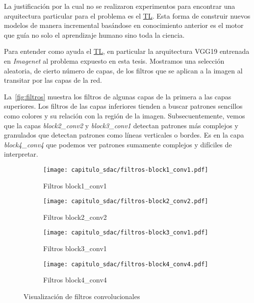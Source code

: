 La justificación por la cual no se realizaron experimentos para encontrar una
arquitectura particular para el problema es el \hyperlink{abbr}{TL}. Esta forma de
construir nuevos modelos de manera incremental basándose en conocimiento
anterior es el motor que guía no solo el aprendizaje humano sino toda la
ciencia.

Para entender como ayuda el \hyperlink{abbr}{TL}, en particular la arquitectura
VGG19 entrenada en \emph{Imagenet} al problema expuesto en esta tesis. Mostramos
una selección aleatoria, de cierto número de capas, de los filtros que se
aplican a la imagen al transitar por las capas de la red. 

La~\autoref{fig:filtros} muestra los filtros de algunas capas de la primera a
las capas superiores. Los filtros de las capas inferiores tienden a buscar
patrones sencillos como colores y su relación con la región de la imagen.
Subsecuentemente, vemos que la capas \emph{block2\_conv2} y \emph{block3\_conv1}
detectan patrones más complejos y granulados que detectan patrones como líneas
verticales o bordes. Es en la capa \emph{block4\_conv4} que podemos ver patrones
sumamente complejos y difíciles de interpretar.

\begin{figure}[H] 
  \begin{subfigure}[b]{0.5\linewidth}
    \centering
    \texttt{[image: capitulo\_sdac/filtros-block1\_conv1.pdf]} 
    \caption{Filtros block1\_conv1}\label{fig7:aa}
    \vspace{4ex}
  \end{subfigure}%
  \begin{subfigure}[b]{0.5\linewidth}
    \centering
    \texttt{[image: capitulo\_sdac/filtros-block2\_conv2.pdf]} 
    \caption{Filtros block2\_conv2}\label{fig7:bb}
    \vspace{4ex}
  \end{subfigure} 
  \begin{subfigure}[b]{0.5\linewidth}
    \centering
    \texttt{[image: capitulo\_sdac/filtros-block3\_conv1.pdf]} 
    \caption{Filtros block3\_conv1}\label{fig7:cc}
  \end{subfigure}%
  \begin{subfigure}[b]{0.5\linewidth}
    \centering
    \texttt{[image: capitulo\_sdac/filtros-block4\_conv4.pdf]} 
    \caption{Filtros block4\_conv4}\label{fig7:dd}
  \end{subfigure} 
  \caption{Visualización de filtros convolucionales}\label{fig:filtros} 
\end{figure}

